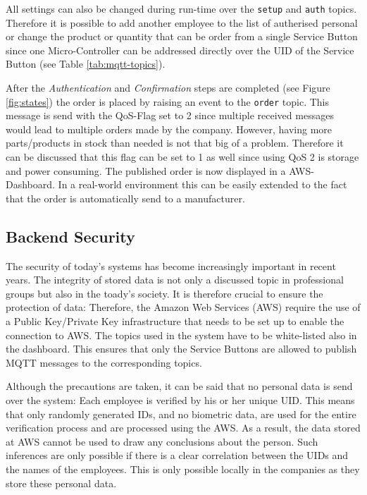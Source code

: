 All settings can also be changed during run-time over the \texttt{setup} and \texttt{auth} topics. Therefore it is possible to add another employee to the list of autherised personal or change the product or quantity that can be order from a single Service Button since one Micro-Controller can be addressed directly over the UID of the Service Button (see Table \ref{tab:mqtt-topics}).

After the \textit{Authentication} and \textit{Confirmation} steps are completed (see Figure \ref{fig:states}) the order is placed by raising an event to the \texttt{order} topic. This message is send with the QoS-Flag set to 2 since multiple received messages would lead to multiple orders made by the company. However, having more parts/products in stock than needed is not that big of a problem. Therefore it can be discussed that this flag can be set to 1 as well since using QoS 2 is storage and power consuming. The published order is now displayed in a AWS-Dashboard. In a real-world environment this can be easily extended to the fact that the order is automatically send to a manufacturer.

\subsection{Backend Security}
\label{sec:Backend:Security}
The security of today's systems has become increasingly important in recent years. The integrity of stored data is not only a discussed topic in professional groups but also in the toady's society. It is therefore crucial to ensure the protection of data: Therefore, the Amazon Web Services (AWS) require the use of a Public Key/Private Key infrastructure that needs to be set up to enable the connection to AWS. The topics used in the system have to be white-listed also in the dashboard. This ensures that only the Service Buttons are allowed to publish MQTT messages to the corresponding topics.

Although the precautions are taken, it can be said that no personal data is send over the system: Each employee is verified by his or her unique UID. This means that only randomly generated IDs, and no biometric data, are used for the entire verification process and are processed using the AWS. As a result, the data stored at AWS cannot be used to draw any conclusions about the person. Such inferences are only possible if there is a clear correlation between the UIDs and the names of the employees. This is only possible locally in the companies as they store these personal data. 

